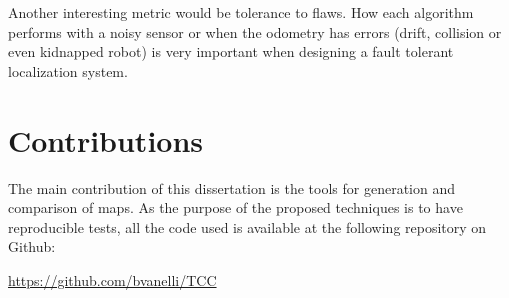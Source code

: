 Another interesting metric would be tolerance to flaws. How each algorithm performs with a noisy sensor or when the odometry has errors (drift, collision or even kidnapped robot) is very important when designing a fault tolerant localization system.

\section{Contributions}

The main contribution of this dissertation is the tools for generation and comparison of maps. As the purpose of the proposed techniques is to have reproducible tests, all the code used is available at the following repository on Github: 

\url{https://github.com/bvanelli/TCC}
